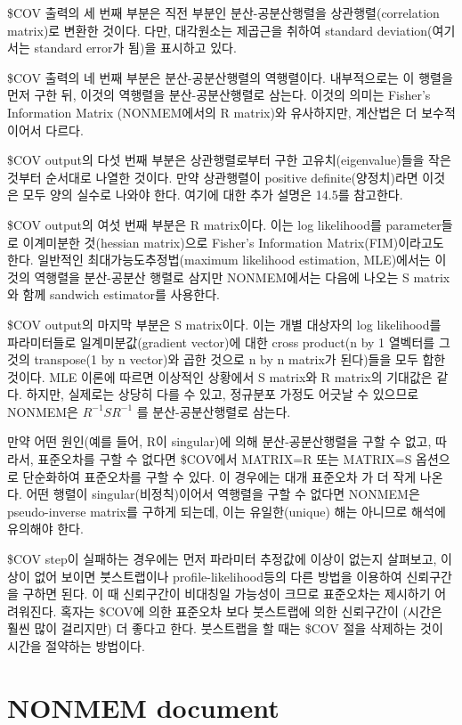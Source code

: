\documentclass[
  10pt,
]{krantz}
\begin{document}
\$COV 출력의 세 번째 부분은 직전 부분인 분산-공분산행렬을 상관행렬(correlation matrix)로 변환한 것이다. 다만, 대각원소는 제곱근을 취하여 standard deviation(여기서는 standard error가 됨)을 표시하고 있다.

\$COV 출력의 네 번째 부분은 분산-공분산행렬의 역행렬이다. 내부적으로는 이 행렬을 먼저 구한 뒤, 이것의 역행렬을 분산-공분산행렬로 삼는다. 이것의 의미는 Fisher's Information Matrix (NONMEM에서의 R matrix)와 유사하지만, 계산법은 더 보수적이어서 다르다.

\$COV output의 다섯 번째 부분은 상관행렬로부터 구한 고유치(eigenvalue)들을 작은 것부터 순서대로 나열한 것이다. 만약 상관행렬이 positive definite(양정치)라면 이것은 모두 양의 실수로 나와야 한다. 여기에 대한 추가 설명은 14.5를 참고한다.

\$COV output의 여섯 번째 부분은 R matrix이다. 이는 log likelihood를 parameter들로 이계미분한 것(hessian matrix)으로 Fisher's Information Matrix(FIM)이라고도 한다. 일반적인 최대가능도추정법(maximum likelihood estimation, MLE)에서는 이것의 역행렬을 분산-공분산 행렬로 삼지만 NONMEM에서는 다음에 나오는 S matrix와 함께 sandwich estimator를 사용한다.

\$COV output의 마지막 부분은 S matrix이다. 이는 개별 대상자의 log likelihood를 파라미터들로 일계미분값(gradient vector)에 대한 cross product(n by 1 열벡터를 그것의 transpose(1 by n vector)와 곱한 것으로 n by n matrix가 된다)들을 모두 합한 것이다. MLE 이론에 따르면 이상적인 상황에서 S matrix와 R matrix의 기대값은 같다. 하지만, 실제로는 상당히 다를 수 있고, 정규분포 가정도 어긋날 수 있으므로 NONMEM은 \(R^{- 1}SR^{- 1}\) 를 분산-공분산행렬로 삼는다.

만약 어떤 원인(예를 들어, R이 singular)에 의해 분산-공분산행렬을 구할 수 없고, 따라서, 표준오차를 구할 수 없다면 \$COV에서 MATRIX=R 또는 MATRIX=S 옵션으로 단순화하여 표준오차를 구할 수 있다. 이 경우에는 대개 표준오차 가 더 작게 나온다. 어떤 행렬이 singular(비정칙)이어서 역행렬을 구할 수 없다면 NONMEM은 pseudo-inverse matrix를 구하게 되는데, 이는 유일한(unique) 해는 아니므로 해석에 유의해야 한다.

\$COV step이 실패하는 경우에는 먼저 파라미터 추정값에 이상이 없는지 살펴보고, 이상이 없어 보이면 붓스트랩이나 profile-likelihood등의 다른 방법을 이용하여 신뢰구간을 구하면 된다. 이 때 신뢰구간이 비대칭일 가능성이 크므로 표준오차는 제시하기 어려워진다. 혹자는 \$COV에 의한 표준오차 보다 붓스트랩에 의한 신뢰구간이 (시간은 훨씬 많이 걸리지만) 더 좋다고 한다. 붓스트랩을 할 때는 \$COV 절을 삭제하는 것이 시간을 절약하는 방법이다.

\hypertarget{nonmem-document}{%
\section{NONMEM document}\label{nonmem-document}}
\end{document}
